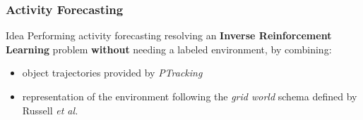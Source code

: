 \begin{frame}
	\frametitle{Activity Forecasting}
	
	\vspace{0.35cm}
	
	\begin{block}{Idea}
		Performing activity forecasting resolving an \textbf{Inverse Reinforcement
		Learning} problem \textbf{without} needing a labeled environment, by combining:
		
		\begin{itemize}
			\item object trajectories provided by \emph{PTracking}
			\item representation of the environment following the \emph{grid world} schema
				  defined by Russell \emph{et al.} \cite{Ng00}
		\end{itemize}
	\end{block}
	
	\begin{center}
	\end{center}
\end{frame}

